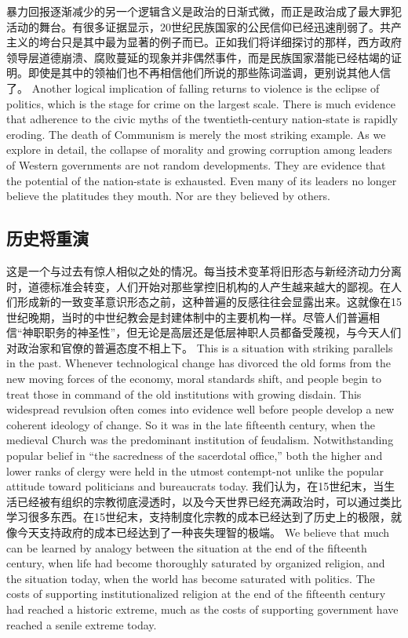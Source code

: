 \begin{paracol}{2}[]
\switchcolumn*
暴力回报逐渐减少的另一个逻辑含义是政治的日渐式微，而正是政治成了最大罪犯活动的舞台。有很多证据显示，20世纪民族国家的公民信仰已经迅速削弱了。共产主义的垮台只是其中最为显著的例子而已。正如我们将详细探讨的那样，西方政府领导层道德崩溃、腐败蔓延的现象并非偶然事件，而是民族国家潜能已经枯竭的证明。即使是其中的领袖们也不再相信他们所说的那些陈词滥调，更别说其他人信了。
\switchcolumn
Another logical implication of falling returns to violence is the eclipse of politics, which is the stage for crime on the largest scale. There is much evidence that adherence to the civic myths of the twentieth-century nation-state is rapidly eroding. The death of Communism is merely the most striking example. As we explore in detail, the collapse of morality and growing corruption among leaders of Western governments are not random developments. They are evidence that the potential of the nation-state is exhausted. Even many of its leaders no longer believe the platitudes they mouth. Nor are they believed by others.
\end{paracol}

\subsection{历史将重演} 
\begin{paracol}{2}[]
这是一个与过去有惊人相似之处的情况。每当技术变革将旧形态与新经济动力分离时，道德标准会转变，人们开始对那些掌控旧机构的人产生越来越大的鄙视。在人们形成新的一致变革意识形态之前，这种普遍的反感往往会显露出来。这就像在15世纪晚期，当时的中世纪教会是封建体制中的主要机构一样。尽管人们普遍相信“神职职务的神圣性”，但无论是高层还是低层神职人员都备受蔑视，与今天人们对政治家和官僚的普遍态度不相上下。
\switchcolumn
This is a situation with striking parallels in the past. Whenever technological change has divorced the old forms from the new moving forces of the economy, moral standards shift, and people begin to treat those in command of the old institutions with growing disdain. This widespread revulsion often comes into evidence well before people develop a new coherent ideology of change. So it was in the late fifteenth century, when the medieval Church was the predominant institution of feudalism. Notwithstanding popular belief in ``the sacredness of the sacerdotal office,'' both the higher and lower ranks of clergy were held in the utmost contempt-not unlike the popular attitude toward politicians and bureaucrats today.
\switchcolumn*
我们认为，在15世纪末，当生活已经被有组织的宗教彻底浸透时，以及今天世界已经充满政治时，可以通过类比学习很多东西。在15世纪末，支持制度化宗教的成本已经达到了历史上的极限，就像今天支持政府的成本已经达到了一种丧失理智的极端。
\switchcolumn
We believe that much can be learned by analogy between the situation at the end of the fifteenth century, when life had become thoroughly saturated by organized religion, and the situation today, when the world has become saturated with politics. The costs of supporting institutionalized religion at the end of the fifteenth century had reached a historic extreme, much as the costs of supporting government have reached a senile extreme today.
\end{paracol}

